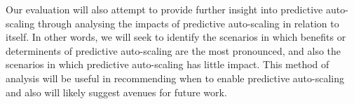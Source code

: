 Our evaluation will also attempt to provide further insight into predictive auto-scaling
through analysing the impacts of predictive auto-scaling in relation to itself.
In other words, we will seek to identify the scenarios in which benefits or
determinents of predictive auto-scaling are the most pronounced, and also the
scenarios in which predictive auto-scaling has little impact. This method of
analysis will be useful in recommending when to enable predictive auto-scaling
and also will likely suggest avenues for future work.

